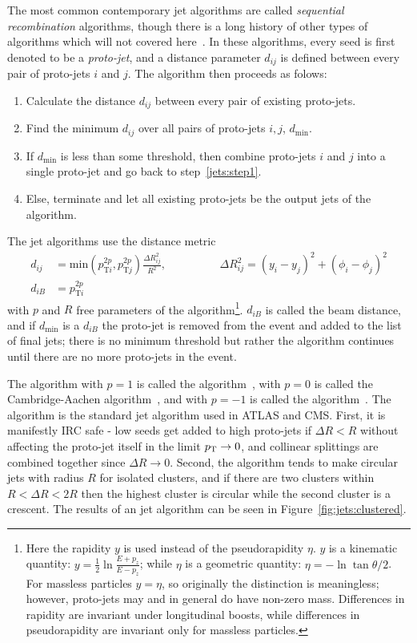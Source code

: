 The most common contemporary jet algorithms are called \textit{sequential recombination} algorithms, though there is a long history of other types of algorithms which will not covered here~\cite{Salam:2009jx}.
In these algorithms, every seed is first denoted to be a \textit{proto-jet}, and a distance parameter $d_{ij}$ is defined between every pair of proto-jets $i$ and $j$.
The algorithm then proceeds as folows:
\begin{enumerate}
  \item Calculate the distance $d_{ij}$ between every pair of existing proto-jets.\label{jets:step1}
  \item Find the minimum $d_{ij}$ over all pairs of proto-jets $i,j$, $d_\text{min}$.
  \item If $d_\text{min}$ is less than some threshold, then combine proto-jets $i$ and $j$ into a single proto-jet and go back to step~\ref{jets:step1}.
  \item Else, terminate and let all existing proto-jets be the output jets of the algorithm.
\end{enumerate}

\noindent The \kt{} jet algorithms use the distance metric
\begin{align}
  d_{ij} &= \text{min}\left(p_{\text{T}i}^{2p},p_{\text{T}j}^{2p}\right)\frac{\Delta R_{ij}^2}{R^2}, \hspace{2cm}\Delta R_{ij}^2 = (y_i-y_j)^2+(\phi_i-\phi_j)^2\\
  d_{iB}&=p_{\text{T}i}^{2p}
\end{align}
with $p$ and $R$ free parameters of the algorithm\footnote{Here the rapidity $y$ is used instead of the pseudorapidity $\eta$. $y$ is a kinematic quantity: $y=\frac{1}{2}\ln\frac{E+p_z}{E-p_z}$; while $\eta$ is a geometric quantity: $\eta = -\ln\tan\theta/2$. For massless particles $y=\eta$, so originally the distinction is meaningless; however, proto-jets may and in general do have non-zero mass. Differences in rapidity are invariant under longitudinal boosts, while differences in pseudorapidity are invariant only for massless particles.}.
$d_{iB}$ is called the beam distance, and if $d_\text{min}$ is a $d_{iB}$ the proto-jet is removed from the event and added to the list of final jets; there is no minimum threshold but rather the algorithm continues until there are no more proto-jets in the event.

The algorithm with $p=1$ is called the \kt{} algorithm~\cite{Ellis:1993tq}, with $p=0$ is called the Cambridge-Aachen algorithm~\cite{Dokshitzer:1997in}, and with $p=-1$ is called the \antikt algorithm~\cite{Cacciari:2008gp}.
The \antikt{} algorithm is the standard jet algorithm used in ATLAS and CMS.
First, it is manifestly IRC safe - low \pt{} seeds get added to high \pt{} proto-jets if $\Delta R<R$ without affecting the proto-jet itself in the limit $p_{\text{T}}\rightarrow 0$, and collinear splittings are combined together since $\Delta R\rightarrow 0$.
Second, the algorithm tends to make circular jets with radius $R$ for isolated clusters, and if there are two clusters within $R<\Delta R<2R$ then the highest \pt{} cluster is circular while the second cluster is a crescent.
The results of an \antikt{} jet algorithm can be seen in Figure~\ref{fig:jets:clustered}.

